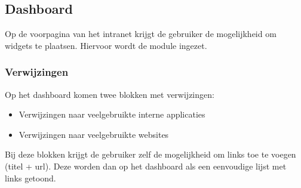 \subsection{Dashboard}\label{dashboard}

Op de voorpagina van het intranet krijgt de gebruiker de mogelijkheid om widgets te plaatsen. Hiervoor wordt de  module ingezet.

\subsubsection{Verwijzingen}

Op het dashboard komen twee blokken met verwijzingen:
\begin{itemize}
\item Verwijzingen naar veelgebruikte interne applicaties
\item Verwijzingen naar veelgebruikte websites
\end{itemize}
Bij deze blokken krijgt de gebruiker zelf de mogelijkheid om links toe te voegen (titel + url). Deze worden dan op het dashboard als een eenvoudige lijst met links getoond.


